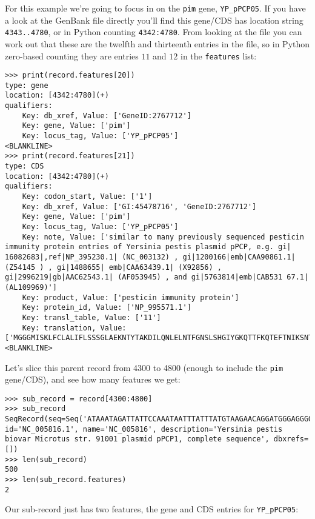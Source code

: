 For this example we're going to focus in on the \verb|pim| gene, \verb|YP_pPCP05|.
If you have a look at the GenBank file directly you'll find this gene/CDS has
location string \texttt{4343..4780}, or in Python counting \texttt{4342:4780}.
From looking at the file you can work out that these are the twelfth and
thirteenth entries in the file, so in Python zero-based counting they are
entries $11$ and $12$ in the \texttt{features} list:

\begin{verbatim}
>>> print(record.features[20])
type: gene
location: [4342:4780](+)
qualifiers:
    Key: db_xref, Value: ['GeneID:2767712']
    Key: gene, Value: ['pim']
    Key: locus_tag, Value: ['YP_pPCP05']
<BLANKLINE>
>>> print(record.features[21])
type: CDS
location: [4342:4780](+)
qualifiers:
    Key: codon_start, Value: ['1']
    Key: db_xref, Value: ['GI:45478716', 'GeneID:2767712']
    Key: gene, Value: ['pim']
    Key: locus_tag, Value: ['YP_pPCP05']
    Key: note, Value: ['similar to many previously sequenced pesticin immunity protein entries of Yersinia pestis plasmid pPCP, e.g. gi| 16082683|,ref|NP_395230.1| (NC_003132) , gi|1200166|emb|CAA90861.1| (Z54145 ) , gi|1488655| emb|CAA63439.1| (X92856) , gi|2996219|gb|AAC62543.1| (AF053945) , and gi|5763814|emb|CAB531 67.1| (AL109969)']
    Key: product, Value: ['pesticin immunity protein']
    Key: protein_id, Value: ['NP_995571.1']
    Key: transl_table, Value: ['11']
    Key: translation, Value: ['MGGGMISKLFCLALIFLSSSGLAEKNTYTAKDILQNLELNTFGNSLSHGIYGKQTTFKQTEFTNIKSNTKKHIALINKDNSWMISLKILGIKRDEYTVCFEDFSLIRPPTYVAIHPLLIKKVKSGNFIVVKEIKKSIPGCTVYYH']
<BLANKLINE>
\end{verbatim}

Let's slice this parent record from 4300 to 4800 (enough to include the \verb|pim|
gene/CDS), and see how many features we get:

\begin{verbatim}
>>> sub_record = record[4300:4800]
>>> sub_record
SeqRecord(seq=Seq('ATAAATAGATTATTCCAAATAATTTATTTATGTAAGAACAGGATGGGAGGGGGA...TTA'), id='NC_005816.1', name='NC_005816', description='Yersinia pestis biovar Microtus str. 91001 plasmid pPCP1, complete sequence', dbxrefs=[])
>>> len(sub_record)
500
>>> len(sub_record.features)
2
\end{verbatim}

Our sub-record just has two features, the gene and CDS entries for \verb|YP_pPCP05|:

